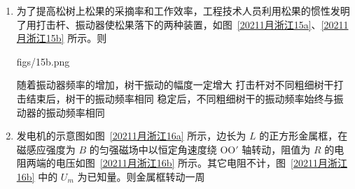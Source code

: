 \documentclass[\gkver]{gaokaozhenti}
\begin{document}
\begin{enumerate}
{C．要使轻核发生聚变，必须使它们的距离达到 $10^{-15} \Um$ 以内，核力才能起作用，那么热核反应时要将轻核加热到很高的温度，使它们具有足够的动能来克服核力而聚变在一起形成新的原子核，即高温能使轻核克服核力而聚变，但不是能使所有的原子核克服核力而聚变，选项 C 错误；

D．对相同质量的核燃料，轻核聚变比重核裂变产能多，选项 D 正确。

故选 ABD。
}

\item
为了提高松树上松果的采摘率和工作效率，工程技术人员利用松果的惯性发明了用打击杆、振动器使松果落下的两种装置，如图~\ref{20211月浙江15a}、\ref{20211月浙江15b} 所示。则

{figs/15b.png}

{随着振动器频率的增加，树干振动的幅度一定增大}
{打击杆对不同粗细树干打击结束后，树干的振动频率相同}
{稳定后，不同粗细树干的振动频率始终与振动器的振动频率相同}


\item
发电机的示意图如图~\ref{20211月浙江16a} 所示，边长为 $L$ 的正方形金属框，在磁感应强度为 $B$ 的匀强磁场中以恒定角速度绕 OO$'$ 轴转动，阻值为 $R$ 的电阻两端的电压如图~\ref{20211月浙江16b} 所示。其它电阻不计，图~\ref{20211月浙江16b} 中的 $U_{m}$ 为已知量。则金属框转动一周


\end{enumerate}
\end{document}
